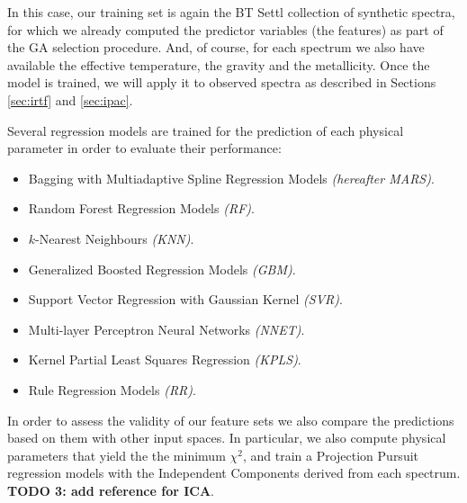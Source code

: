 In this case, our training set is again the BT Settl collection of
synthetic spectra, for which we already computed the predictor
variables (the features) as part of the GA selection procedure. And,
of course, for each spectrum we also have available the effective
temperature, the gravity and the metallicity. Once the model is
trained, we will apply it to observed spectra as described in
Sections \ref{sec:irtf} and \ref{sec:ipac}.  

Several regression models are trained for the prediction of each
physical parameter in order to evaluate their performance:

\begin{itemize}

\item {Bagging with Multiadaptive Spline Regression Models \emph{(hereafter MARS)}.}

\item {Random Forest Regression Models \emph{(RF)}.}

\item {$k$-Nearest Neighbours \emph{(KNN)}.}

\item {Generalized Boosted Regression Models \emph{(GBM)}.}

\item {Support Vector Regression with Gaussian Kernel \emph{(SVR)}.}

\item {Multi-layer Perceptron Neural Networks \emph{(NNET)}.}

\item {Kernel Partial Least Squares Regression \emph{(KPLS)}.}

\item {Rule Regression Models \emph{(RR)}.}

\end{itemize}

In order to assess the validity of our feature sets we also compare
the predictions based on them with other input spaces. In particular,
we also compute physical parameters that yield the the minimum
$\chi^2$, and train a Projection Pursuit regression models with the
Independent Components derived from each spectrum. {\bf TODO 3: add
reference for ICA}.

